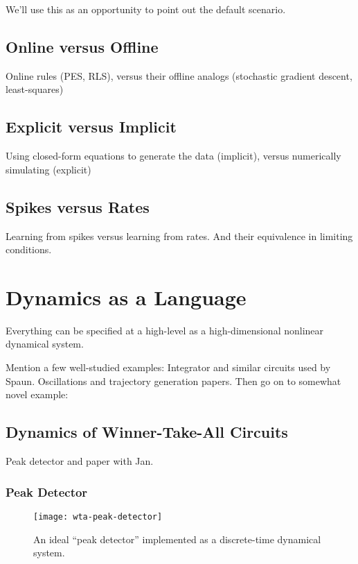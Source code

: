 We'll use this as an opportunity to point out the default scenario.

\subsection{Online versus Offline}

Online rules (PES, RLS), versus their offline analogs (stochastic gradient descent, least-squares)

\subsection{Explicit versus Implicit}

Using closed-form equations to generate the data (implicit), versus numerically simulating (explicit)

\subsection{Spikes versus Rates}

Learning from spikes versus learning from rates. And their equivalence in limiting conditions.

\section{Dynamics as a Language}
\label{sec:dynamics-language}

Everything can be specified at a high-level as a high-dimensional nonlinear dynamical system.

Mention a few well-studied examples:
Integrator and similar circuits used by Spaun.
Oscillations and trajectory generation papers.
Then go on to somewhat novel example:

\subsection{Dynamics of Winner-Take-All Circuits}

Peak detector and paper with Jan.

\subsubsection{Peak Detector}

\begin{figure}
\centering
\texttt{[image: wta-peak-detector]}
\caption{ \label{fig:wta-peak-detector}
  An ideal ``peak detector'' implemented as a discrete-time dynamical system.
}
\end{figure}

